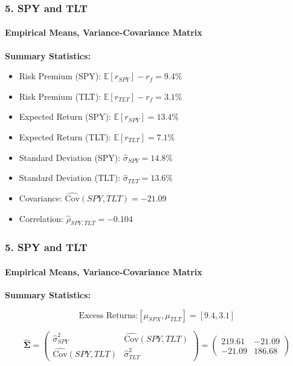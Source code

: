 \documentclass{beamer}
\begin{document}
\begin{frame}[t]
    \frametitle{5. SPY and TLT}
    \framesubtitle{Empirical Means, Variance-Covariance Matrix}

    \vspace{1em}

    \textbf{Summary Statistics:}
    \begin{itemize}
        \item Risk Premium (SPY): $\mathbb{E}[r_{SPY}] - r_{f} = 9.4\%$
        \item Risk Premium (TLT): $\mathbb{E}[r_{TLT}] - r_{f} = 3.1\%$
         \item Expected Return (SPY): $\mathbb{E}[r_{SPY}] = 13.4\%$
        \item Expected Return (TLT): $\mathbb{E}[r_{TLT}]= 7.1\%$
        \item Standard Deviation (SPY): $\hat{\sigma}_{SPY} = 14.8\%$
        \item Standard Deviation (TLT): $\hat{\sigma}_{TLT} = 13.6\%$
        \item Covariance: $\widehat{\text{Cov}}(SPY,TLT) = -21.09$
        \item Correlation: $\hat{\rho}_{SPY,TLT} = -0.104$
    \end{itemize}

\end{frame}

\begin{frame}[t]
    \frametitle{5. SPY and TLT}
    \framesubtitle{Empirical Means, Variance-Covariance Matrix}

    \textbf{Summary Statistics:}

    $$\text{Excess Returns:} [\mu_{SPX},\mu_{TLT}] = [9.4,3.1]$$
    
    $$\hat{\boldsymbol{\Sigma}} = \begin{pmatrix}
    \hat{\sigma}_{SPY}^2 & \widehat{\text{Cov}}(SPY,TLT) \\
    \widehat{\text{Cov}}(SPY,TLT) & \hat{\sigma}_{TLT}^2
    \end{pmatrix} = \begin{pmatrix}
    219.61 & -21.09 \\
    -21.09 & 186.68
    \end{pmatrix}$$


\end{frame}
\end{document}
